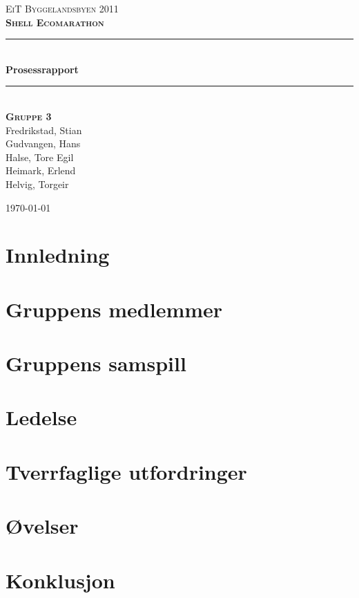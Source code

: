 \documentclass[a4paper,11pt]{report}
\newcommand{\HRule}{\rule{\linewidth}{0.5mm}}
\begin{document}
\begin{titlepage}

\begin{center}
\textsc{\huge EiT Byggelandsbyen 2011}\\
\textsc{\large \bfseries Shell Ecomarathon}\\[1.5cm]

\HRule \\[0.4cm]
{ \huge \bfseries Prosessrapport}\\[0.4cm]
\HRule \\[1.5cm] 

\textsc{\bfseries Gruppe 3}\\
Fredrikstad, Stian\\
Gudvangen, Hans\\
Halse, Tore Egil\\
Heimark, Erlend\\
Helvig, Torgeir\\

\vfill
 
{\large \today}

\end{center}
\end{titlepage}
\cleardoublepage
{}
\tableofcontents
\clearpage

\chapter{Innledning}

\chapter{Gruppens medlemmer}





\chapter{Gruppens samspill}



\chapter{Ledelse}

\chapter{Tverrfaglige utfordringer}

\chapter{Øvelser}

\chapter{Konklusjon}


\appendix




\clearpage 
 
 
\end{document}

